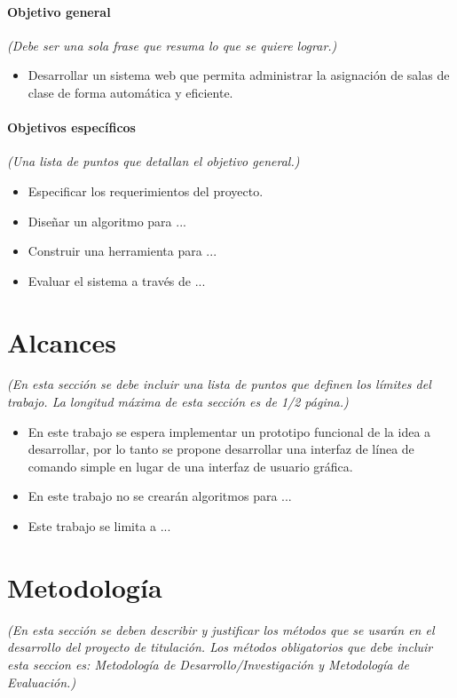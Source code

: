 \documentclass[11pt,letterpaper]{article}
\begin{document}
\paragraph{Objetivo general}
\emph{(Debe ser una sola frase que resuma lo que se quiere lograr.)} 
\begin{itemize}
\item Desarrollar un sistema web que permita administrar la asignación de salas de clase de forma automática y eficiente. 
\end{itemize}

\paragraph{Objetivos específicos} \emph{(Una lista de puntos que detallan el objetivo general.)}
\begin{itemize}
\item Especificar los requerimientos del proyecto.
\item Diseñar un algoritmo para ...
\item Construir una herramienta para ...
\item Evaluar el sistema a través de ... 
\end{itemize}



\section{Alcances}
\emph{(En esta sección se debe incluir una lista de puntos que definen los límites del trabajo. La longitud máxima de esta sección es de 1/2 página.)}
\begin{itemize}
\item En este trabajo se espera implementar un prototipo funcional de la idea a desarrollar, por lo tanto se propone desarrollar una interfaz de línea de comando simple en lugar de una interfaz de usuario gráfica. 
\item En este trabajo no se crearán algoritmos para ... 
\item Este trabajo se limita a ...
\end{itemize}



\section{Metodología}
\emph{(En esta sección se deben describir y justificar los métodos que se usarán en el desarrollo del proyecto de titulación. Los métodos obligatorios que debe incluir esta seccion es: Metodología de Desarrollo/Investigación y Metodología de Evaluación.)}
\end{document}
